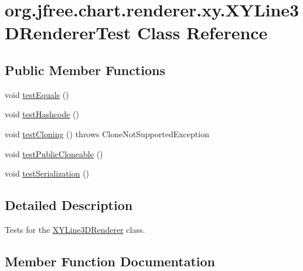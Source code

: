 \hypertarget{classorg_1_1jfree_1_1chart_1_1renderer_1_1xy_1_1_x_y_line3_d_renderer_test}{}\section{org.\+jfree.\+chart.\+renderer.\+xy.\+X\+Y\+Line3\+D\+Renderer\+Test Class Reference}
\label{classorg_1_1jfree_1_1chart_1_1renderer_1_1xy_1_1_x_y_line3_d_renderer_test}
\subsection*{Public Member Functions}
\begin{DoxyCompactItemize}
\item 
void \mbox{\hyperlink{classorg_1_1jfree_1_1chart_1_1renderer_1_1xy_1_1_x_y_line3_d_renderer_test_aed6193cac1330d87ead07134dd2f6622}{test\+Equals}} ()
\item 
void \mbox{\hyperlink{classorg_1_1jfree_1_1chart_1_1renderer_1_1xy_1_1_x_y_line3_d_renderer_test_aa081c627b145de442af079a6db902e30}{test\+Hashcode}} ()
\item 
void \mbox{\hyperlink{classorg_1_1jfree_1_1chart_1_1renderer_1_1xy_1_1_x_y_line3_d_renderer_test_ad77b79fab6d736f55257f23f9f3a1314}{test\+Cloning}} ()  throws Clone\+Not\+Supported\+Exception 
\item 
void \mbox{\hyperlink{classorg_1_1jfree_1_1chart_1_1renderer_1_1xy_1_1_x_y_line3_d_renderer_test_a8b8a999bf2bfd0f4e91bf5654473d676}{test\+Public\+Cloneable}} ()
\item 
void \mbox{\hyperlink{classorg_1_1jfree_1_1chart_1_1renderer_1_1xy_1_1_x_y_line3_d_renderer_test_a5f1f9ee87ebb99822cf28de5c952c782}{test\+Serialization}} ()
\end{DoxyCompactItemize}


\subsection{Detailed Description}
Tests for the \mbox{\hyperlink{classorg_1_1jfree_1_1chart_1_1renderer_1_1xy_1_1_x_y_line3_d_renderer}{X\+Y\+Line3\+D\+Renderer}} class. 

\subsection{Member Function Documentation}
\mbox{\label{classorg_1_1jfree_1_1chart_1_1renderer_1_1xy_1_1_x_y_line3_d_renderer_test_ad77b79fab6d736f55257f23f9f3a1314}} 
